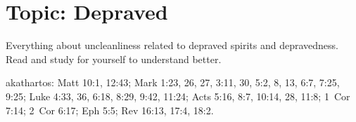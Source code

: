 \section{Topic: Depraved}

Everything about uncleanliness related to depraved spirits and depravedness. Read and study for yourself to understand better. 

\gls{akathartos}: Matt 10:1, 12:43; Mark 1:23, 26, 27, 3:11, 30, 5:2, 8, 13, 6:7, 7:25, 9:25; Luke 4:33, 36, 6:18, 8:29, 9:42, 11:24; Acts 5:16, 8:7, 10:14, 28, 11:8; 1~Cor 7:14; 2~Cor 6:17; Eph 5:5; Rev 16:13, 17:4, 18:2.

